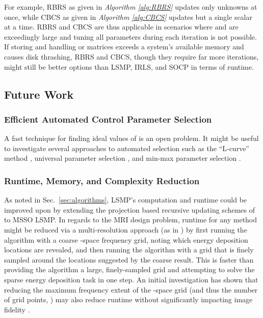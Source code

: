 \documentclass[final]{siamltex}
\begin{document}
   For example, RBRS as given in {\em{Algorithm \ref{alg:RBRS}}}
   updates only  unknowns at once, while CBCS as given in
   {\em{Algorithm \ref{alg:CBCS}}} updates but a single scalar at a
   time.  RBRS and CBCS are thus applicable in scenarios where  and
    are exceedingly large and tuning all  parameters during
   each iteration is not possible.  If storing and handling  or  matrices exceeds a system's available memory
   and causes disk thrashing, RBRS and CBCS, though they require far
   more iterations, might still be better options than LSMP, IRLS, and
   SOCP in terms of runtime.

   \subsection{Future Work}

   \subsubsection{Efficient Automated Control Parameter Selection} A
   fast technique for finding ideal values of  is an open
   problem.  It might be useful to investigate several approaches to
   automated selection such as the ``L-curve'' method \cite{Han1994},
   universal parameter selection \cite{Don1994}, and min-max parameter
   selection \cite{Joh1994}.

   \subsubsection{Runtime, Memory, and Complexity Reduction} As noted
   in Sec.~\ref{sec:algorithms}, LSMP's computation and runtime could
   be improved upon by extending the projection based recursive
   updating schemes of \cite{Cot1999, Cot2005} to MSSO LSMP\@.  In
   regards to the MRI design problem, runtime for any method might be
   reduced via a multi-resolution approach (as in \cite{Mal2005}) by
   first running the algorithm with a coarse -space frequency grid,
   noting which energy deposition locations are revealed, and then
   running the algorithm with a grid that is finely sampled around the
   locations suggested by the coarse result.  This is faster than
   providing the algorithm a large, finely-sampled grid and attempting
   to solve the sparse energy deposition task in one step.  An initial
   investigation has shown that reducing the maximum frequency extent
   of the -space grid (and thus the number of grid points, ) may
   also reduce runtime without significantly impacting image fidelity
   \cite{Zel2008_TMI}.
\end{document}
